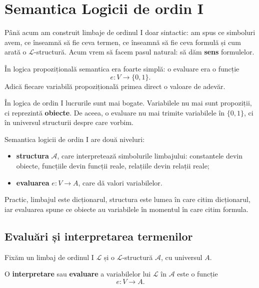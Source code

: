 
\chapter{Semantica Logicii de ordin I}

Până acum am construit limbaje de ordinul I doar sintactic: am spus ce simboluri avem, ce înseamnă să fie ceva termen, ce înseamnă să fie ceva formulă și cum arată o
\(\mathcal{L}\)-structură. Acum vrem să facem pasul natural: să dăm \textbf{sens} formulelor.

În logica propozițională semantica era foarte simplă: o evaluare era o funcție
\[
	e : V \to \{0,1\}.
\]
Adică fiecare variabilă propozițională primea direct o valoare de adevăr.

În logica de ordin I lucrurile sunt mai bogate. Variabilele nu mai sunt propoziții, ci reprezintă \textbf{obiecte}. De aceea, o evaluare nu mai trimite variabilele în
\(\{0,1\}\), ci în universul structurii despre care vorbim.

\begin{note}
	Semantica logicii de ordin I are două niveluri:
	\begin{itemize}
		\item \textbf{structura} \( \mathcal{A} \), care interpretează simbolurile limbajului: constantele devin obiecte, funcțiile devin funcții reale, relațiile devin relații reale;
		\item \textbf{evaluarea} \( e : V \to A \), care dă valori variabilelor.
	\end{itemize}

	Practic, limbajul este dicționarul, structura este lumea în care citim dicționarul, iar evaluarea spune ce obiecte au variabilele în momentul în care citim formula.
\end{note}

\section{Evaluări și interpretarea termenilor}

Fixăm un limbaj de ordinul I \( \mathcal{L} \) și o \( \mathcal{L} \)-structură \( \mathcal{A} \), cu universul \(A\).

\begin{definition}
	O \textbf{interpretare} sau \textbf{evaluare} a variabilelor lui \( \mathcal{L} \) în \( \mathcal{A} \) este o funcție
	\[
		e : V \to A.
	\]
\end{definition}

